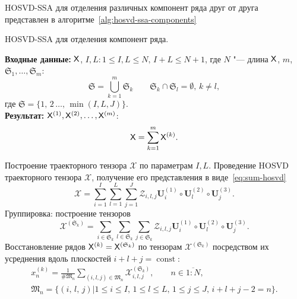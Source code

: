 \documentclass[specialist,
    substylefile = spbu_report.rtx,
    subf,href,colorlinks=true, 12pt]{disser}
\theoremstyle{plain}
\theoremstyle{definition}
\theoremstyle{remark}
\newcommand{\Input}{\textbf{Входные данные: }}
\newcommand{\Output}{\textbf{Результат: }}
\begin{document}
    HOSVD-SSA для отделения различных компонент ряда друг от друга представлен в алгоритме~\ref{alg:hosvd-ssa-components}
    \begin{algorithm}
        \caption{HOSVD-SSA для отделения компонент ряда.}
        \label{alg:hosvd-ssa-components}
        \Input $\mathsf{X}$, $I,L: 1\leqslant I,L \leqslant N,\, I + L \leqslant N + 1$, где $N$ "--- длина $\mathsf{X}$, $m$,
        $\mathfrak{S}_1, \ldots, \mathfrak{S}_m:$
        \[
            \mathfrak{S}=\bigcup_{k=1}^{m}\mathfrak{S}_k \qquad \mathfrak{S}_k\cap \mathfrak{S}_l =\emptyset,\, k\ne l,
        \] где $\mathfrak{S}=\{1,\, 2\,\ldots,\, \min(I, L, J)\}$.\\
        \Output $\mathsf{X}^{(1)}, \mathsf{X}^{(2)}, \ldots, \mathsf{X}^{(m)}$:
        \[
            \mathsf{X}=\sum_{k=1}^{m}\mathsf{X}^{(k)}.
        \]
        \begin{algorithmic}[1]
            \State \label{alg:first-step}
            Построение траекторного тензора $\mathcal{X}$ по параметрам $I, L$.
            \State \label{alg:second-step}
            Проведение HOSVD траекторного тензора $\mathcal{X}$, получение его представления в виде~\eqref{eq:sum-hosvd}
            \begin{equation}
                \mathcal{X}=\sum_{i=1}^{I} \sum_{l=1}^{L} \sum_{j=1}^{J} \mathcal{Z}_{i,l,j} \mathbf{U}^{(1)}_{i}
                \circ \mathbf{U}^{(2)}_{l} \circ \mathbf{U}^{(3)}_{j}.
                \label{eq:trajectory-hosvd}
            \end{equation}
            \State Группировка: построение тензоров
            \begin{equation*}
                \mathcal{X}^{(\mathfrak{S}_k)}=\sum_{i \in \mathfrak{S}_k} \sum_{l\in \mathfrak{S}_k} \sum_{j\in \mathfrak{S}_k}
                \mathcal{Z}_{i,l,j} \mathbf{U}^{(1)}_{i}\circ \mathbf{U}^{(2)}_{l} \circ \mathbf{U}^{(3)}_{j}.
            \end{equation*}
            \State Восстановление рядов $\mathsf{X}^{(k)}=\mathsf{X}^{(\mathfrak{S}_k)}$ по тензорам $\mathcal{X}^{(\mathfrak{S}_k)}$ посредством их усреднения вдоль
            плоскостей $i+l+j=\operatorname{const}$:
            \begin{gather*}
                x^{(k)}_n=\frac{1}{\#\mathfrak{M}_n}\sum_{(i,l,j)\in \mathfrak{M}_n} \mathcal{X}^{(\mathfrak{S}_k)}_{i,l,j},\qquad n\in \overline{1:N},\\
                \mathfrak{M}_n=\{(i,\, l,\, j) | 1\leqslant i \leqslant I,\, 1\leqslant l \leqslant L,\, 1\leqslant j \leqslant J,\, i+l+j-2=n\}.
            \end{gather*}
        \end{algorithmic}
    \end{algorithm}
\end{document}
